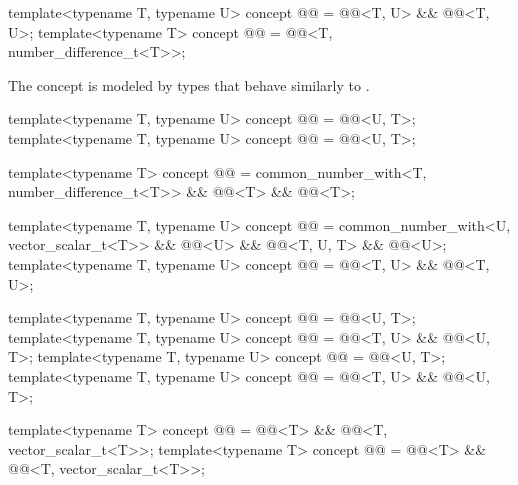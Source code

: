 \begin{itemdecl}
template<typename T, typename U>
concept @@ = @@<T, U> && @@<T, U>;
template<typename T>
concept @@ = @@<T, number_difference_t<T>>;
\end{itemdecl}

\begin{itemdescr}
\pnum
\begin{note}
The  concept is modeled by types
that behave similarly to .
\end{note}
\end{itemdescr}

\begin{itemdecl}
template<typename T, typename U>
concept @@ = @@<U, T>;
template<typename T, typename U>
concept @@ = @@<U, T>;

template<typename T>
concept @@ =
  common_number_with<T, number_difference_t<T>> && @@<T> && @@<T>;

template<typename T, typename U>
concept @@ = common_number_with<U, vector_scalar_t<T>> && @@<U> &&
                      @@<T, U, T> && @@<U>;
template<typename T, typename U>
concept @@ = @@<T, U> && @@<T, U>;

template<typename T, typename U>
concept @@ = @@<U, T>;
template<typename T, typename U>
concept @@ = @@<T, U> && @@<U, T>;
template<typename T, typename U>
concept @@ = @@<U, T>;
template<typename T, typename U>
concept @@ = @@<T, U> && @@<U, T>;

template<typename T>
concept @@ = @@<T> && @@<T, vector_scalar_t<T>>;
template<typename T>
concept @@ = @@<T> && @@<T, vector_scalar_t<T>>;
\end{itemdecl}

